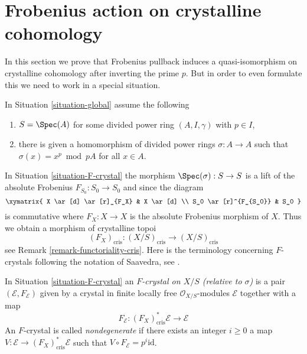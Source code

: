 \section{Frobenius action on crystalline cohomology}
\label{section-frobenius}

\noindent
In this section we prove that Frobenius pullback induces a quasi-isomorphism
on crystalline cohomology after inverting the prime $p$. But in order to
even formulate this we need to work in a special situation.

\begin{situation}
\label{situation-F-crystal}
In Situation \ref{situation-global} assume the following
\begin{enumerate}
\item $S = \Spec(A)$ for some divided power ring $(A, I, \gamma)$
with $p \in I$,
\item there is given a homomorphism of divided power rings $\sigma : A \to A$
such that $\sigma(x) = x^p \bmod pA$ for all $x \in A$.
\end{enumerate}
\end{situation}

\noindent
In Situation \ref{situation-F-crystal} the morphism
$\Spec(\sigma) : S \to S$ is a lift of the absolute Frobenius
$F_{S_0} : S_0 \to S_0$ and since the diagram
$$
\xymatrix{
X \ar[d] \ar[r]_{F_X} & X \ar[d] \\
S_0 \ar[r]^{F_{S_0}} & S_0
}
$$
is commutative where $F_X : X \to X$ is the absolute Frobenius morphism
of $X$. Thus we obtain a morphism of crystalline topoi
$$
(F_X)_{\text{cris}} :
(X/S)_{\text{cris}}
\longrightarrow
(X/S)_{\text{cris}}
$$
see Remark \ref{remark-functoriality-cris}. Here is the terminology concerning
$F$-crystals following the notation of Saavedra, see
\cite{Saavedra}.

\begin{definition}
\label{definition-F-crystal}
In Situation \ref{situation-F-crystal} an {\it $F$-crystal on $X/S$
(relative to $\sigma$)} is a pair $(\mathcal{E}, F_\mathcal{E})$
given by a crystal in finite locally free $\mathcal{O}_{X/S}$-modules
$\mathcal{E}$ together with a map
$$
F_\mathcal{E} : (F_X)_{\text{cris}}^*\mathcal{E} \longrightarrow \mathcal{E}
$$
An $F$-crystal is called {\it nondegenerate} if there exists an integer
$i \geq 0$ a map $V : \mathcal{E} \to (F_X)_{\text{cris}}^*\mathcal{E}$
such that $V \circ F_{\mathcal{E}} = p^i \text{id}$.
\end{definition}

